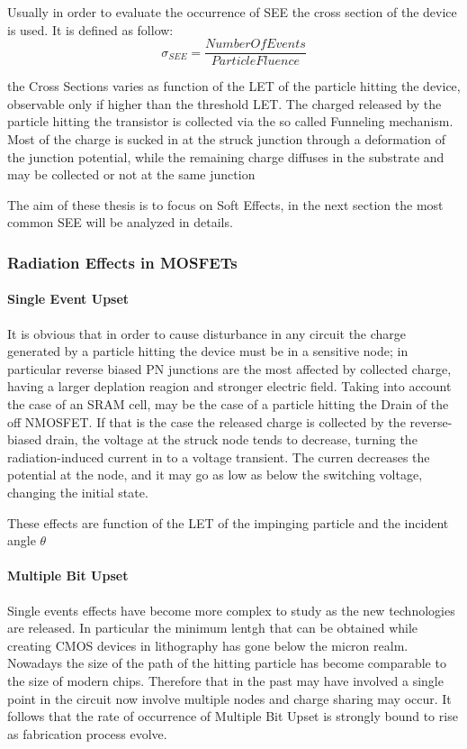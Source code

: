 \documentclass[./dissertation.tex]{subfiles}
\begin{document}
Usually in order to evaluate the occurrence of SEE the cross section of the device is used. It is defined as follow:
\begin{equation}
    \sigma_{SEE} = \frac{NumberOfEvents}{ParticleFluence}
\end{equation}

the Cross Sections varies as function of the LET of the particle hitting the device, observable only if higher than the threshold LET. The charged released by the particle hitting the transistor is collected via the so called Funneling mechanism. Most of the charge is sucked in at the struck junction through a deformation of the junction potential, while the remaining charge diffuses in the substrate and may be collected or not at the same junction\cite{bib1}

The aim of these thesis is to focus on Soft Effects, in the next section the most common SEE will be analyzed in details.

\subsubsection{Radiation Effects in MOSFETs}
\paragraph{Single Event Upset}
It is obvious that in order to cause disturbance in any circuit the charge generated by a particle hitting the device must be in a sensitive node; in particular reverse biased PN junctions are the most affected by collected charge, having a larger deplation reagion and stronger electric field. Taking into account the case of an SRAM cell, may be the case of a particle hitting the Drain of the off NMOSFET. If that is the case the released charge is collected by the reverse-biased drain, the voltage at the struck node tends to decrease, turning the radiation-induced current in to a voltage transient. The curren decreases the potential at the node, and it may go as low as below the switching voltage, changing the initial state.

These effects are function of the LET of the impinging particle and the incident angle $\theta$

\paragraph{Multiple Bit Upset}
Single events effects have become more complex  to study as the new technologies are released. In particular the minimum lentgh that can be obtained while creating CMOS devices in lithography has gone below the micron realm. Nowadays the size of the path of the hitting particle has become comparable to the size of modern chips. Therefore that in the past may have involved a single point in the circuit now involve multiple nodes and charge sharing may occur. It follows that the rate of occurrence of Multiple Bit Upset is strongly bound to rise as fabrication process evolve.
\end{document}
